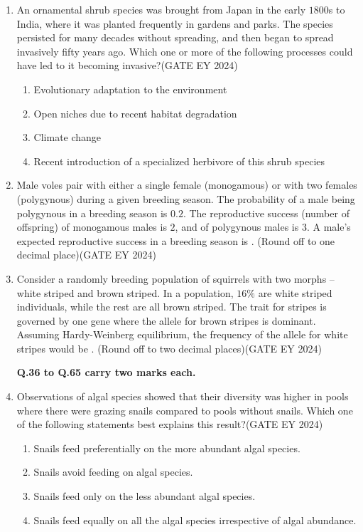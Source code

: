 \begin{enumerate}
\item An ornamental shrub species was brought from Japan in the early $1800$s to India, where it was planted frequently in gardens and parks. The species persisted for many decades without spreading, and then began to spread invasively fifty years ago. Which one or more of the following processes could have led to it becoming invasive?\hfill{(GATE EY 2024)}
    \begin{enumerate}
        \item Evolutionary adaptation to the environment
        \item Open niches due to recent habitat degradation
        \item Climate change
        \item Recent introduction of a specialized herbivore of this shrub species
    \end{enumerate}

\item Male voles pair with either a single female (monogamous) or with two females (polygynous) during a given breeding season. The probability of a male being polygynous in a breeding season is $0.2$. The reproductive success (number of offspring) of monogamous males is $2$, and of polygynous males is $3$. A male's expected reproductive success in a breeding season is \underline{\hspace{3cm}}. (Round off to one decimal place)\hfill{(GATE EY 2024)}
 

\item Consider a randomly breeding population of squirrels with two morphs -- white striped and brown striped. In a population, $16\%$ are white striped individuals, while the rest are all brown striped. The trait for stripes is governed by one gene where the allele for brown stripes is dominant. Assuming Hardy-Weinberg equilibrium, the frequency of the allele for white stripes would be \underline{\hspace{3cm}}. (Round off to two decimal places)\hfill{(GATE EY 2024)}
 

\textbf{Q.36 to Q.65 carry two marks each.}

\item Observations of algal species showed that their diversity was higher in pools where there were grazing snails compared to pools without snails. Which one of the following statements best explains this result?\hfill{(GATE EY 2024)}
    \begin{enumerate}
        \item Snails feed preferentially on the more abundant algal species.
        \item Snails avoid feeding on algal species.
        \item Snails feed only on the less abundant algal species.
        \item Snails feed equally on all the algal species irrespective of algal abundance.
    \end{enumerate}


\end{enumerate}
